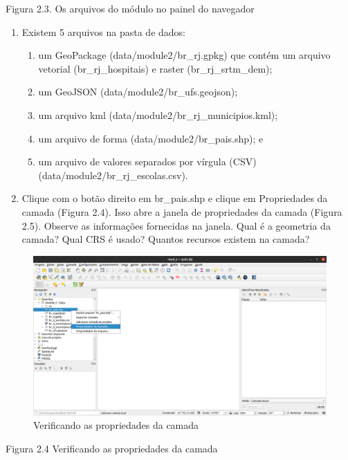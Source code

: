 \documentclass[
]{krantz}
\providecommand{\tightlist}{%
  \setlength{\itemsep}{0pt}\setlength{\parskip}{0pt}}
\begin{document}
Figura 2.3. Os arquivos do módulo no painel do navegador

\begin{enumerate}
\def\labelenumi{\arabic{enumi}.}
\setcounter{enumi}{5}
\item
  Existem 5 arquivos na pasta de dados:

  \begin{enumerate}
  \def\labelenumii{\arabic{enumii}.}
  \tightlist
  \item
    um GeoPackage (data/module2/br\_rj.gpkg) que contém um arquivo vetorial (br\_rj\_hospitais) e raster (br\_rj\_srtm\_dem);
  \item
    um GeoJSON (data/module2/br\_ufs.geojson);
  \item
    um arquivo kml (data/module2/br\_rj\_municipios.kml);
  \item
    um arquivo de forma (data/module2/br\_pais.shp); e
  \item
    um arquivo de valores separados por vírgula (CSV) (data/module2/br\_rj\_escolas.csv).
  \end{enumerate}
\item
  Clique com o botão direito em br\_pais.shp e clique em Propriedades da camada (Figura 2.4). Isso abre a janela de propriedades da camada (Figura 2.5). Observe as informações fornecidas na janela. Qual é a geometria da camada? Qual CRS é usado? Quantos recursos existem na camada?
\end{enumerate}

\begin{figure}
\centering
\includegraphics{media/modulo2/qgis-browser-3.png}
\caption{Verificando as propriedades da camada}
\end{figure}

Figura 2.4 Verificando as propriedades da camada
\end{document}
